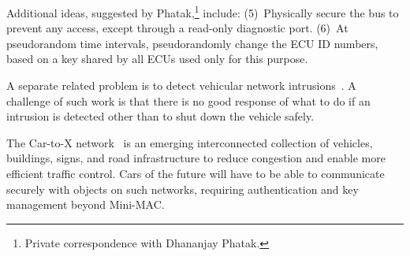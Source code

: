 
Additional ideas, suggested by Phatak,\footnote{Private correspondence with Dhananjay Phatak.} 
include:
(5)~Physically secure the bus to prevent any access, except through
a read-only diagnostic port.
(6)~At pseudorandom time intervals, pseudorandomly change the ECU ID numbers, 
based on a key shared by all ECUs used only for this purpose.

A separate related problem is to detect vehicular network intrusions~\cite{Otsuka2014}. A challenge of such work is that
there is no good response of what to do if an intrusion is detected other than to shut down the vehicle safely.

The Car-to-X network~\cite{C2X} is an emerging interconnected collection of vehicles, buildings, signs, and road infrastructure 
to reduce congestion and enable more efficient traffic control. Cars of the future will have to be able to communicate
securely with objects on such networks, requiring authentication and key management beyond Mini-MAC.

